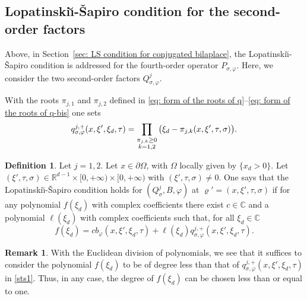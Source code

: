 \documentclass[10pt]{amsart}
\theoremstyle{plain}
\theoremstyle{definition}
\newtheorem{definition}[theorem]{Definition}
\newtheorem{remark}[theorem]{Remark}
\def\R{\mathbb{R}}
\def\C{\mathbb{C}}
\newcommand{\LS}{Lopatinski\u{\i}-\v{S}apiro\xspace}
\let\k\kappa
\let\y\varrho
\let \Im \relax
\DeclareMathOperator{\Im}{Im}
\newcommand{\Qsig}{Q_{\sigma}}
\newcommand{\Pconj}{P_{\sigma,\varphi}}
\newcommand{\Qconj}{Q_{\sigma,\varphi}}
\newcommand{\qconj}{q_{\sigma,\varphi}}
\begin{document}
\subsection{Lopatinski\u{\i}-\v{S}apiro condition for the
second-order factors}

Above, in Section~\ref{sec: LS condition for conjugated bilaplace}, the \LS condition is addressed for the
fourth-order operator $\Pconj$. Here, we consider the
two second-order factors $\Qconj^j$.

With the roots $\pi_{j,1}$ and $\pi_{j,2}$ defined in \eqref{eq: form of the roots of q}--\eqref{eq: form of the
roots of q-bis} one sets
\begin{equation*}
\qconj^{j,+} (x,\xi', \xi_d ,\tau)
=\prod_{\substack{\Im\pi_{j,k} \geq 0\\k=1,2}}
\big(\xi_d-\pi_{j,k} (x,\xi',\tau,\sigma) \big).
\end{equation*}

\begin{definition}\label{de2}
Let $j=1,2$. Let $x \in \partial\Omega$, with $\Omega$ locally given by
$\{ x_d>0\}$.
Let $(\xi',\tau,\sigma)\in \R^{d-1}\times [0,+\infty) \times
[0,+\infty)$ with
$(\xi',\tau,\sigma)\neq0$. One says that the \LS condition holds for
$(\Qsig^j,B, \varphi)$ at $\y' = (x,\xi',\tau,\sigma)$ if for any
polynomial $f(\xi_d)$ with complex coefficients there
exist $c\in\C$ and a polynomial $\ell(\xi_d)$ with
complex coefficients such that, for all $\xi_d\in\C$
\begin{equation}\label{sts1}
f(\xi_d)=c b_{\varphi}(x,\xi',\xi_d,\tau)
+\ell(\xi_d) \qconj^{j,+}(x,\xi',\xi_d,\tau).
\end{equation}
\end{definition}

\begin{remark}
\label{sts2}
With the Euclidean division of polynomials, we see that it suffices
to consider the polynomial $f(\xi_d)$ to be of degree less
than that of $\qconj^{j,+} (x,\xi',\xi_d,\tau)$ in
\eqref{sts1}. Thus, in any case, the degree of $f(\xi_d)$ can be chosen
less than or equal to one.
\end{remark}
\end{document}
